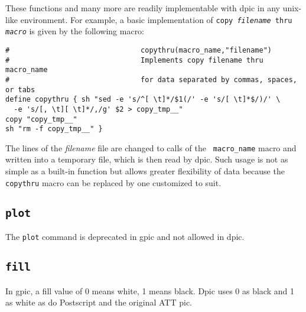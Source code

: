 \documentclass[11pt]{article}
\newcommand{\bq}{}
\newcommand{\Postscript}{{\bq Postscript}\xspace}
\newcommand{\dpic}{{\bq dpic}\xspace}
\newcommand{\ntt}[1]{\\\hbox{}\quad{\tt #1}}
\begin{document}
  These functions and many more are readily implementable with dpic in any
  unix-like environment.
%
%
%
For example, a basic implementation of
{\tt copy {\sl filename} thru {\sl macro}}
is given by the following macro:
\begin{verbatim}
#                               copythru(macro_name,"filename")
#                               Implements copy filename thru macro_name 
#                               for data separated by commas, spaces, or tabs
define copythru { sh "sed -e 's/^[ \t]*/$1(/' -e 's/[ \t]*$/)/' \
  -e 's/[, \t][ \t]*/,/g' $2 > copy_tmp__"
copy "copy_tmp__"
sh "rm -f copy_tmp__" }
\end{verbatim}
The lines of the {\sl filename} file are changed to calls of the {\tt
macro\_name} macro and written into a temporary file, which is then
read by \dpic.  Such usage is not as simple as a built-in function but
allows greater flexibility of data because the {\tt copythru}
macro can be replaced by one customized to suit.

\subsection{{\tt plot}}
  The {\tt plot} command is deprecated in gpic and not allowed in dpic.

\subsection{{\tt fill}}
  In gpic, a fill value of 0 means white, 1 means black.
  Dpic uses 0 as black and 1 as
  white as do \Postscript and the original ATT pic.
\end{document}

